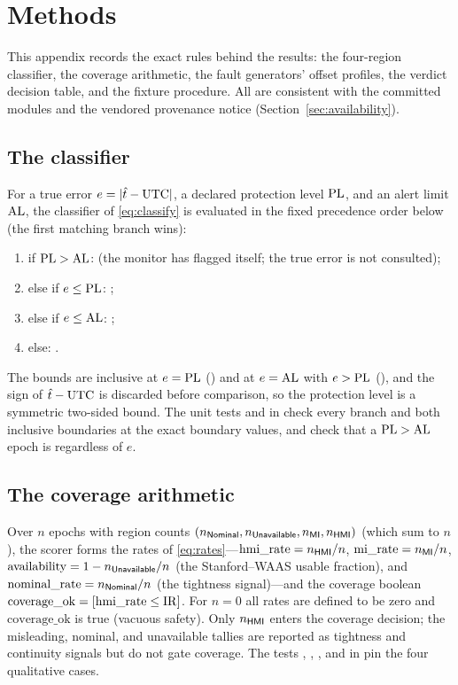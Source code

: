 \section{Methods}
\label{app:methods}

This appendix records the exact rules behind the results: the four-region
classifier, the coverage arithmetic, the fault generators' offset profiles, the
verdict decision table, and the  fixture procedure. All
are consistent with the committed modules  and the vendored
provenance notice (Section~\ref{sec:availability}).

\subsection{The classifier}
\label{app:classify}

For a true error $e=|\hat t-\mathrm{UTC}|$, a declared protection level $\mathrm{PL}$, and an alert
limit $\mathrm{AL}$, the classifier of \eqref{eq:classify} is evaluated in the fixed
precedence order below (the first matching branch wins):
\begin{enumerate}
  \item if $\mathrm{PL}>\mathrm{AL}$: \Unavail{} (the monitor has flagged itself; the true error
  is not consulted);
  \item else if $e\le\mathrm{PL}$: \Nominal{};
  \item else if $e\le\mathrm{AL}$: \MI{};
  \item else: \HMI{}.
\end{enumerate}
The bounds are inclusive at $e=\mathrm{PL}$ (\Nominal{}) and at $e=\mathrm{AL}$ with $e>\mathrm{PL}$
(\MI{}), and the sign of $\hat t-\mathrm{UTC}$ is discarded before comparison, so the
protection level is a symmetric two-sided bound. The unit tests
 and  in  check
every branch and both inclusive boundaries at the exact boundary values, and check
that a $\mathrm{PL}>\mathrm{AL}$ epoch is \Unavail{} regardless of $e$.

\subsection{The coverage arithmetic}
\label{app:coverage}

Over $n$ epochs with region counts
$(n_{\textsf{Nominal}{}},n_{\textsf{Unavailable}{}},n_{\textsf{MI}{}},n_{\textsf{HMI}{}})$ (which sum to $n$), the
scorer forms the rates of \eqref{eq:rates}---$\mathrm{hmi\_rate}=n_{\textsf{HMI}{}}/n$,
$\mathrm{mi\_rate}=n_{\textsf{MI}{}}/n$, $\mathrm{availability}=1-n_{\textsf{Unavailable}{}}/n$
(the Stanford--WAAS usable fraction), and $\mathrm{nominal\_rate}=n_{\textsf{Nominal}{}}/n$
(the tightness signal)---and the coverage boolean
$\mathrm{coverage\_ok}=[\mathrm{hmi\_rate}\le\mathrm{IR}]$. For $n=0$ all rates are defined
to be zero and $\mathrm{coverage\_ok}$ is true (vacuous safety). Only $n_{\textsf{HMI}{}}$
enters the coverage decision; the misleading, nominal, and unavailable tallies are
reported as tightness and continuity signals but do not gate coverage. The tests ,
,
, and 
in  pin the four qualitative cases.

